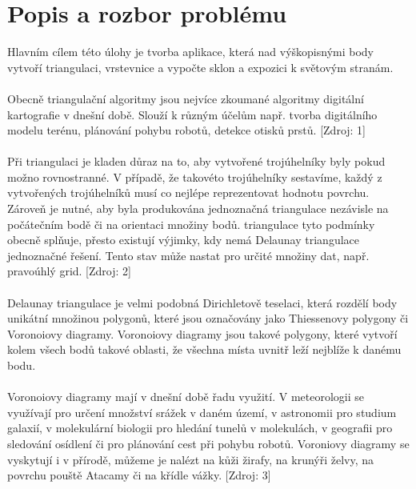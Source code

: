 \documentclass[a4paper, 12pt]{article}
\begin{document}
\section{Popis a rozbor problému}
Hlavním cílem této úlohy je tvorba aplikace, která nad výškopisnými body vytvoří  triangulaci, vrstevnice a vypočte sklon a expozici k světovým stranám.\\
\\
Obecně triangulační algoritmy jsou nejvíce zkoumané algoritmy digitální kartografie v dnešní době. Slouží k různým účelům např. tvorba digitálního modelu terénu, plánování pohybu robotů, detekce otisků prstů.  [Zdroj: 1]\\
\\
Při triangulaci je kladen důraz na to, aby vytvořené trojúhelníky byly pokud možno rovnostranné. V případě, že takovéto trojúhelníky sestavíme, každý z vytvořených trojúhelníků musí co nejlépe reprezentovat hodnotu povrchu. Zároveň je nutné, aby byla produkována jednoznačná triangulace nezávisle na počátečním bodě či na orientaci množiny bodů.  triangulace tyto podmínky obecně splňuje, přesto existují výjimky, kdy nemá Delaunay triangulace jednoznačné řešení. Tento stav může nastat pro určité množiny dat, např. pravoúhlý grid. [Zdroj: 2]\\
\\
Delaunay triangulace je velmi podobná Dirichletově teselaci, která rozdělí body unikátní množinou polygonů, které jsou označovány jako Thiessenovy polygony či Voronoiovy diagramy. Voronoiovy diagramy jsou takové polygony, které vytvoří kolem všech bodů takové oblasti, že všechna místa uvnitř leží nejblíže k danému bodu. \\
\\
Voronoiovy diagramy mají v dnešní době řadu využití. V meteorologii se využívají pro určení množství srážek v daném území, v astronomii pro studium galaxií, v molekulární biologii pro hledání tunelů v molekulách, v geografii pro sledování osídlení či pro plánování cest při pohybu robotů. Voroniovy diagramy se vyskytují i v přírodě, můžeme je nalézt na kůži žirafy, na krunýři želvy, na povrchu pouště Atacamy či na křídle vážky. [Zdroj: 3]
\end{document}
